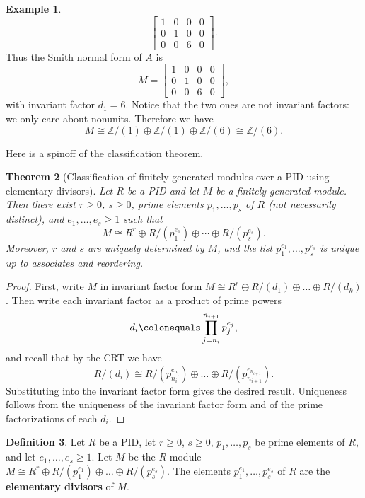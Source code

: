 \documentclass[12pt]{report}
\newtheorem{theorem}{Theorem}[chapter]
\numberwithin{equation}{section}
\numberwithin{theorem}{chapter}
\theoremstyle{definition}
\newtheorem{definition}[theorem]{Definition}
\newtheorem{example}[theorem]{Example}
\newtheorem*{basic properties}{Basic Properties}
\newtheorem*{Important Remark}{Important Remark}
\newcommand{\df}[1]{{\bf #1}\index{#1}}
\newcommand{\Z}{\mathbb{Z}}
\begin{document}
\begin{example}
$$\begin{bmatrix}
1 & 0 & 0  & 0 \\
0 & 1 & 0 & 0\\
0 & 0 & 6 & 0
\end{bmatrix}
.$$
Thus the Smith normal form of $A$ is 
$$M=\begin{bmatrix}
1 & 0 & 0 & 0 \\
0 & 1 & 0 & 0 \\
0 & 0 & 6 & 0
\end{bmatrix},$$
with invariant factor $d_1=6$. Notice that the two ones are not invariant factors: we only care about nonunits. Therefore we have 
$$M\cong \Z/(1)\oplus \Z/(1)\oplus \Z/(6)\cong \Z/(6).$$
\end{example}


Here is a spinoff of the \hyperref[classification mods over pids]{classification theorem}.


\begin{theorem}[Classification of finitely generated modules over a PID using elementary divisors]\label{classification elementary divisors}
Let $R$ be a PID and let $M$ be a finitely generated module. Then there exist $r \geqslant 0$, $s \geqslant 0$, prime elements $p_1,\ldots,p_s$ of $R$ (not necessarily distinct), and $e_1,\ldots ,e_s \geqslant 1$ such that 
$$M \cong R^r \oplus R/(p_1^{e_1}) \oplus \cdots \oplus R/(p_s^{e_s}).$$
Moreover, $r$ and $s$ are uniquely determined by $M$, and the list $p_1^{e_1},\ldots, p_s^{e_s}$ is unique up to associates and reordering.
\end{theorem}
 
\begin{proof}
First, write $M$ in invariant factor form $M \cong R^r \oplus R/(d_1) \oplus \dots \oplus R/(d_k)$. Then write each invariant factor as a product of prime powers 
$$d_i \colonequals \prod_{j=n_i}^{n_{i+1}} p_j^{e_j},$$ 
and recall that by the CRT we have
$$R/(d_i)\cong R/(p_{n_i}^{e_{n_i}})\oplus\dots\oplus R/(p_{n_{i+1}}^{e_{n_{i+1}}}).$$ 
Substituting into the invariant factor form gives the desired result. Uniqueness follows from the uniqueness of the invariant factor form and of the prime factorizations of each $d_i$.
 \end{proof}



\begin{definition} 
Let $R$ be a PID, let $r \geqslant 0$, $s \geqslant 0$, $p_1,\ldots,p_s$ be prime elements of $R$, and let $e_1,\ldots,e_s \geqslant 1$. Let $M$ be the $R$-module $M \cong R^r \oplus R/(p_1^{e_1}) \oplus \dots \oplus R/(p_s^{e_s})$. The elements $p_1^{e_1},\ldots, p_s^{e_s}$ of $R$ are the \df{elementary divisors} of $M$.
\end{definition}
\end{document}
